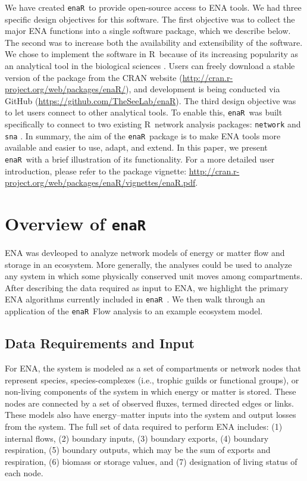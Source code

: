 \documentclass[11pt]{article}
\newcommand{\R}{R}
\newcommand{\enaR}{\texttt{enaR}}
\begin{document}
\begin{spacing}{2}
We have created \enaR\ to provide open-source access to ENA tools.  We
had three specific design objectives for this software.  The first
objective was to collect the major ENA functions into a single
software package, which we describe below.  The second was to increase
both the availability and extensibility of the software. We chose to
implement the software in \R\ because of its increasing popularity as
an analytical tool in the biological sciences
\citep[e.g.,][]{dixon2003vegan, metcalf2012, revell2012phytools}.
Users can freely download a stable version of the package from the
CRAN website (\url{http://cran.r-project.org/web/packages/enaR/}), and
development is being conducted via GitHub
(\url{https://github.com/TheSeeLab/enaR}).  The third design objective
was to let users connect to other analytical tools.  To enable this,
\enaR\ was built specifically to connect to two existing \R\ network
analysis packages:  \texttt{network} \citep{butts08_network} and
\texttt{sna} \citep{butts08_social}.  In summary, the aim of the
\enaR\ package is to make ENA tools more available and easier to use,
adapt, and extend.  In this paper, we present \enaR\ with a brief
illustration of its functionality. For a more detailed user
introduction, please refer to the package vignette:
\url{http://cran.r-project.org/web/packages/enaR/vignettes/enaR.pdf}.

\section{Overview of \enaR}
ENA was devleoped to analyze network models of energy or matter flow
and storage in an ecosystem.  More generally, the analyses could be
used to analyze any system in which some physically conserved unit
moves among compartments. After describing the data required as
input to ENA, we highlight the primary ENA algorithms currently
included in \enaR\ .  We then walk through an application of the
\enaR\ Flow analysis to an example ecosystem model.

\subsection{Data Requirements and Input}
For ENA, the system is modeled as a set of compartments or network nodes that
represent species, species-complexes (i.e., trophic guilds or
functional groups), or non-living components of the system in which
energy or matter is stored.  These nodes are connected by a set of
observed fluxes, termed directed edges or links.  %
These models also have energy--matter inputs into the system
 and output losses from the system.
The full set of data required to perform ENA includes: (1) internal
flows, (2) boundary inputs, (3) boundary exports, (4) boundary
respiration, (5) boundary outputs, which may be the sum of exports and
respiration, (6) biomass or storage values, and (7) designation of
living status of each node.


\end{spacing}
\end{document}
